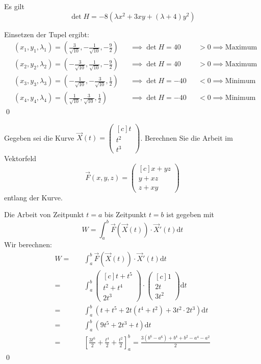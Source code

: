 \documentclass[answers]{exam}
\newcommand{\dt}{\mathrm{d}t} %
\newcommand{\vektor}[1]{\begin{pmatrix*}[c] #1 \end{pmatrix*}}
\begin{document}
\begin{questions}
\begin{solution}
        Es gilt
        $$
            \det H = -8(\lambda x^2 + 3xy + (\lambda+4)y^2)
        $$

        Einsetzen der Tupel ergibt:
        $$
            \begin{aligned}
                 & (x_1, y_1, \lambda_1) = \left(\frac{3}{\sqrt{10}}, -\frac{1}{\sqrt{10}}, -\frac{9}{2}\right) &  & \implies \det H = 40  &  & > 0 \implies \text{Maximum} \\
                 & (x_2, y_2, \lambda_2) = \left(-\frac{3}{\sqrt{10}}, \frac{1}{\sqrt{10}}, -\frac{9}{2}\right) &  & \implies \det H = 40  &  & > 0 \implies \text{Maximum} \\
                 & (x_3, y_3, \lambda_3) = \left(-\frac{1}{\sqrt{10}}, -\frac{3}{\sqrt{10}}, \frac{1}{2}\right) &  & \implies \det H = -40 &  & < 0 \implies \text{Minimum} \\
                 & (x_4, y_4, \lambda_4) = \left(\frac{1}{\sqrt{10}}, \frac{3}{\sqrt{10}}, \frac{1}{2}\right)   &  & \implies \det H = -40 &  & < 0 \implies \text{Minimum}
            \end{aligned}
        $$\qed
    \end{solution}

    \newpage

    \question
    Gegeben sei die Kurve $\vec{X}(t) = \vektor{t \\ t^2 \\ t^3}$.
    Berechnen Sie die Arbeit im Vektorfeld
    $$
        \vec{F}(x, y, z) = \vektor{x+yz \\ y + xz \\ z + xy}
    $$
    entlang der Kurve.
    \begin{solution}
        Die Arbeit von Zeitpunkt $t=a$ bis Zeitpunkt $t=b$ ist gegeben mit
        $$
            W = \int^b_a \vec{F} (\vec{X}(t)) \cdot \vec{X}'(t) \dt
        $$
        Wir berechnen:
        $$
            \begin{aligned}
                W =\quad & \int^b_a \vec{F} (\vec{X}(t)) \cdot \vec{X}'(t) \dt                                                                    \\
                =\quad   & \int^b_a \vektor{t + t^5                                                                                               \\ t^2 + t^4 \\ 2t^3} \cdot \vektor{1 \\ 2t \\ 3t^2} \dt \\
                =\quad   & \int^b_a \left( t + t^5 + 2t(t^4 + t^2) + 3t^2 \cdot 2t^3\right)  \dt                                                  \\
                =\quad   & \int^b_a \left(9t^5 + 2t^3 + t\right) \dt                                                                              \\
                =\quad   & \left[ \frac{3t^6}{2} + \frac{t^4}{2} + \frac{t^2}{2} \right]^b_a     = \frac{3(b^6 - a^6) + b^4 + b^2 - a^4 - a^2}{2}
            \end{aligned}
        $$\qed
    \end{solution}


\end{questions}
\end{document}
